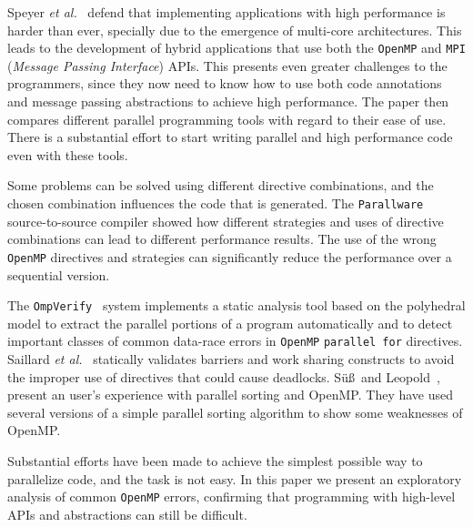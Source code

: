 Speyer \textit{et al.}~\cite{4755913} defend that implementing applications with high performance is harder than ever, specially due to the emergence of multi-core architectures. This leads to the development of hybrid applications that use both the \texttt{OpenMP} and \texttt{MPI} (\emph{Message Passing Interface}) APIs. This presents even greater challenges to the programmers, since they now need to know how to use both code annotations and message passing abstractions to achieve high performance. The paper then compares different parallel programming tools with regard to their ease of use. There is a substantial effort to start writing parallel and high performance code even with these tools.

Some problems can be solved using different directive combinations, and the chosen combination influences the code that is generated. The \texttt{Parallware}~\cite{Parallware:2014} source-to-source compiler showed how different strategies and uses of directive combinations can lead to different performance results. The use of the wrong \texttt{OpenMP} directives and strategies can significantly reduce the performance over a sequential version.

The \texttt{OmpVerify}~\cite{Basupalli:2011} system implements a static analysis tool based on the polyhedral model to extract the parallel portions of a program automatically and to detect important classes of common data-race errors in \texttt{OpenMP} \texttt{parallel for} directives. Saillard \textit{et al.}~\cite{Saillard:2014} statically validates barriers and work sharing constructs to avoid the improper use of directives that could cause deadlocks. S\"{u}\ss~and Leopold~\cite{Leopold:userOpenMP}, present an user's experience with parallel sorting and OpenMP. They have used several versions of a simple parallel sorting algorithm to show some weaknesses of OpenMP.

Substantial efforts have been made to achieve the simplest possible way to parallelize code, and the task is not easy. In this paper we present an exploratory analysis of common \texttt{OpenMP} errors, confirming that programming with high-level APIs and abstractions can still be difficult.